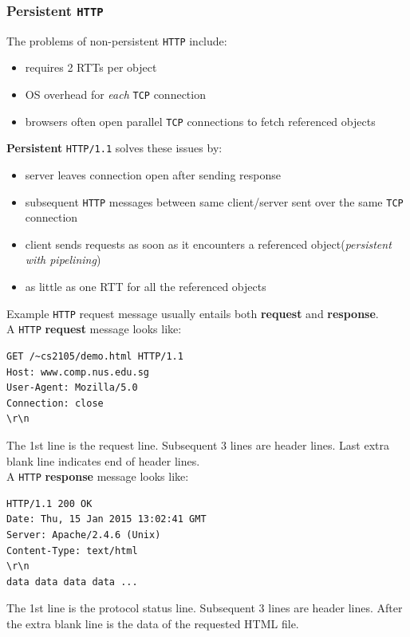 \documentclass[12pt]{article}
\theoremstyle{definition}
\begin{document}
\subsubsection{Persistent \texttt{HTTP}}
The problems of non-persistent \texttt{HTTP} include:
\begin{itemize}
  \item requires 2 RTTs per object
  \item OS overhead for \textit{each} \texttt{TCP} connection
  \item browsers often open parallel \texttt{TCP} connections to fetch referenced objects
\end{itemize}
\textbf{Persistent} \texttt{HTTP/1.1} solves these issues by:
\begin{itemize}
  \item server leaves connection open after sending response
  \item subsequent \texttt{HTTP} messages between same client/server sent over the same \texttt{TCP} connection
  \item client sends requests as soon as it encounters a referenced object(\textit{persistent with pipelining})
  \item as little as one RTT for all the referenced objects
\end{itemize}
Example \texttt{HTTP} request message usually entails both \textbf{request} and \textbf{response}.\\
A \texttt{HTTP} \textbf{request} message looks like:

\begin{verbatim}
GET /~cs2105/demo.html HTTP/1.1
Host: www.comp.nus.edu.sg
User-Agent: Mozilla/5.0
Connection: close
\r\n
\end{verbatim}
The 1st line is the request line. Subsequent 3 lines are header lines. Last extra blank line indicates end of header lines.\\
A \texttt{HTTP} \textbf{response} message looks like:
\begin{verbatim}
HTTP/1.1 200 OK
Date: Thu, 15 Jan 2015 13:02:41 GMT
Server: Apache/2.4.6 (Unix)
Content-Type: text/html
\r\n
data data data data ...
\end{verbatim}
The 1st line is the protocol status line. Subsequent 3 lines are header lines. After the extra blank line is the data of the requested HTML file.
\end{document}
